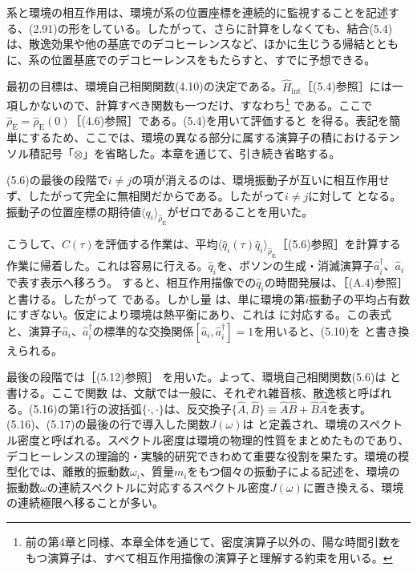 系と環境の相互作用は、環境が系の位置座標を連続的に監視することを記述する、(2.91)の形をしている。したがって、さらに計算をしなくても、結合(5.4)は、散逸効果や他の基底でのデコヒーレンスなど、ほかに生じうる帰結とともに、系の位置基底でのデコヒーレンスをもたらすと、すでに予想できる。

最初の目標は、環境自己相関関数(4.10)の決定である。$\hat H_{\mathrm{int}}$［(5.4)参照］には一項しかないので、計算すべき関数も一つだけ、すなわち\footnote{前の第4章と同様、本章全体を通じて、密度演算子以外の、陽な時間引数をもつ演算子は、すべて相互作用描像の演算子と理解する約束を用いる。}
である。ここで$\hat\rho_{\mathrm E}=\hat\rho_{\mathrm E}(0)$［(4.6)参照］である。(5.4)を用いて評価すると
を得る。表記を簡単にするため、ここでは、環境の異なる部分に属する演算子の積におけるテンソル積記号「$\otimes$」を省略した。本章を通じて、引き続き省略する。

\hypertarget{srcpage:180}{}\label{srcpage:180}
(5.6)の最後の段階で$i\ne j$の項が消えるのは、環境振動子が互いに相互作用せず、したがって完全に無相関だからである。したがって$i\ne j$に対して
となる。振動子の位置座標の期待値$\langle q_i\rangle_{\hat\rho_{\mathrm E}}$がゼロであることを用いた。

こうして、$C(\tau)$を評価する作業は、平均$\langle\hat q_i(\tau)\hat q_i\rangle_{\hat\rho_{\mathrm E}}$［(5.6)参照］を計算する作業に帰着した。これは容易に行える。$\hat q_i$を、ボソンの生成・消滅演算子$\hat a_i^{\dagger}$、$\hat a_i$で表す表示へ移ろう。
すると、相互作用描像での$\hat q_i$の時間発展は、［(A.4)参照］
と書ける。したがって
である。しかし量
は、単に環境の第$i$振動子の平均占有数にすぎない。仮定により環境は熱平衡にあり、これは
に対応する。この表式と、演算子$\hat a_i$、$\hat a_i^{\dagger}$の標準的な交換関係$[\hat a_i,\hat a_i^{\dagger}]=1$を用いると、(5.10)を
と書き換えられる。

\hypertarget{srcpage:181}{}\label{srcpage:181}
最後の段階では［(5.12)参照］
を用いた。よって、環境自己相関関数(5.6)は
と書ける。ここで関数
は、文献では一般に、それぞれ雑音核、散逸核と呼ばれる。(5.16)の第1行の波括弧$\{\cdot,\cdot\}$は、反交換子$\{\hat A,\hat B\}\equiv\hat A\hat B+\hat B\hat A$を表す。(5.16)、(5.17)の最後の行で導入した関数$J(\omega)$は
と定義され、環境のスペクトル密度と呼ばれる。スペクトル密度は環境の物理的性質をまとめたものであり、デコヒーレンスの理論的・実験的研究できわめて重要な役割を果たす。環境の模型化では、離散的振動数$\omega_i$、質量$m_i$をもつ個々の振動子による記述を、環境の振動数$\omega$の連続スペクトルに対応するスペクトル密度$J(\omega)$に置き換える、環境の連続極限へ移ることが多い。

